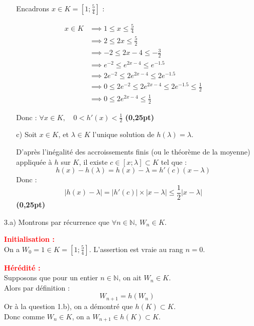 \documentclass[12pt]{article}
\begin{document}
\begin{enumerate}
\begin{enumerate}
Encadrons \( x \in K = \left[1 ; \frac{5}{4} \right] \) :

\begin{equation*}
\begin{aligned}
x \in K &\implies 1 \leq x \leq \frac{5}{4} \\
       &\implies 2 \leq 2x \leq \frac{5}{2} \\
       &\implies -2 \leq 2x - 4 \leq -\frac{3}{2} \\
       &\implies e^{-2} \leq e^{2x - 4} \leq e^{-1.5} \\
       &\implies 2e^{-2} \leq 2e^{2x - 4} \leq 2e^{-1.5} \\
       &\implies 0 \leq 2e^{-2} \leq 2e^{2x - 4} \leq 2e^{-1.5} \leq \frac{1}{2} \\
       &\implies 0 \leq 2e^{2x - 4} \leq \frac{1}{2}
\end{aligned}
\end{equation*}

Donc : \( \forall x \in K, \quad 0 < h'(x) < \frac{1}{2} \) \hfill \textbf{(0,25pt)}
        \item[c)] Soit \( x \in K \), et \( \lambda \in K \) l’unique solution de \( h(\lambda) = \lambda \).

        D’après l’inégalité des accroissements finis (ou le théorème de la moyenne) appliquée à \( h \) sur \( K \), il existe \( c \in [x ; \lambda] \subset K \) tel que :
        \[
        h(x) - h(\lambda) = h(x) - \lambda = h'(c)(x - \lambda)
        \]
        Donc :
        \[
        |h(x) - \lambda| = |h'(c)| \times |x - \lambda| \leq \frac{1}{2} |x - \lambda|
        \]
        \hfill \textbf{(0,25pt)}
    \end{enumerate}
    
    \item[3.a)] Montrons par récurrence que \( \forall n \in \mathbb{N},\ W_n \in K \).

\textcolor{red}{\textbf{Initialisation :}}\\
On a \( W_0 = 1 \in K = \left[1 ; \frac{5}{4} \right] \). L’assertion est vraie au rang \( n = 0 \).

\textcolor{red}{\textbf{Hérédité :}}\\
Supposons que pour un entier \( n \in \mathbb{N} \), on ait \( W_n \in K \).\\
Alors par définition :
\[
W_{n+1} = h(W_n)
\]
Or à la question 1.b), on a démontré que \( h(K) \subset K \).\\
Donc comme \( W_n \in K \), on a \( W_{n+1} \in h(K) \subset K \).\\


\end{enumerate}
\end{document}
